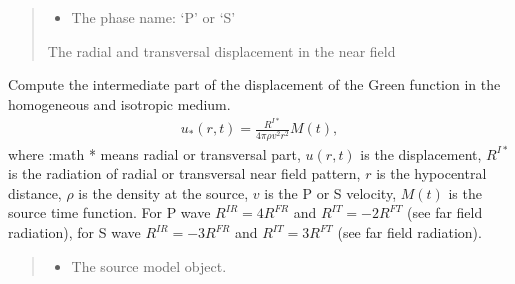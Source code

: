 \documentclass[letterpaper,10pt,english]{sphinxmanual}
\begin{document}
\begin{fulllineitems}
\begin{fulllineitems}
\begin{quote}
\begin{description}
\begin{itemize}
\item {} 
\sphinxAtStartPar
{} \textendash{} The phase name: ‘P’ or ‘S’

\end{itemize}

\sphinxAtStartPar
The radial and transversal displacement in the near field

\end{description}\end{quote}

\end{fulllineitems}


\begin{fulllineitems}
\label{\detokenize{api_lib:green_functions.HomogeneousGreenFunction.intermediate}}
\pysigstartsignatures
{}
\pysigstopsignatures
\sphinxAtStartPar
Compute the intermediate part of the displacement
of the Green function in the homogeneous and isotropic medium.
\begin{equation*}
\begin{split}u_* \left(r, t \right) = \frac{R^{I*}}{4\pi\rho v^2 r^2} M\left( t \right),\end{split}
\end{equation*}
\sphinxAtStartPar
where :math * means radial or transversal part,
\(u \left(r, t \right)\) is the displacement,
\(R^{I*}\) is the radiation of radial or transversal near field pattern,
\(r\) is the hypocentral distance, \(\rho\) is the density at the source,
\(v\) is the P or S velocity,
\(M\left( t \right)\) is the source time function.
For P wave \(R^{IR}= 4R^{FR}\) and \(R^{IT}= -2R^{FT}\) (see far field radiation),
for S wave \(R^{IR}= -3R^{FR}\) and \(R^{IT}= 3R^{FT}\) (see far field radiation).
\begin{quote}\begin{description}
\begin{itemize}
\item {} 
\sphinxAtStartPar
{} \textendash{} The source model object.


\end{itemize}
\end{description}
\end{quote}
\end{fulllineitems}
\end{fulllineitems}
\end{document}
